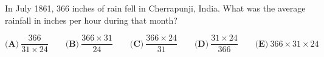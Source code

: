In July 1861, $ 366$ inches of rain fell in Cherrapunji, India. What was the average rainfall in inches per hour during that month?

\[ \textbf{(A)}\ \frac{366}{31 \times 24} \qquad
\textbf{(B)}\ \frac{366 \times 31}{24} \qquad
\textbf{(C)}\ \frac{366 \times 24}{31} \qquad
\textbf{(D)}\ \frac{31 \times 24}{366} \qquad
\textbf{(E)}\ 366 \times 31 \times 24
\]

